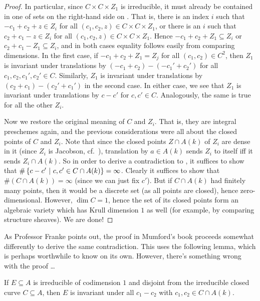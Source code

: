 \documentclass[a4paper,parskip=half,numbers=enddot, DIV=12]{scrreprt}
\begin{document}
\begin{proof}
	In particular, since $C\times C\times Z_1$ is irreducible, it must already be contained in one of sets on the right-hand side on . That is, there is an index $i$ such that $-c_1+c_2+z\in Z_i$ for all $(c_1,c_2,z)\in C\times C\times Z_1$, or there is an $i$ such that $c_2+c_1-z\in Z_i$ for all $(c_1,c_2,z)\in C\times C\times Z_1$. Hence $-c_1+c_2+Z_1\subseteq Z_i$ or $c_2+c_1-Z_1\subseteq Z_i$, and in both cases equality follows easily from comparing dimensions. In the first case, if $-c_1+c_2+Z_1=Z_j$ for all $(c_1,c_2)\in C^2$, then $Z_1$ is invariant under translations by $(-c_1+c_2)-(-c_1'+c_2')$ for all $c_1,c_2,c_1',c_2'\in C$. Similarly, $Z_1$ is invariant under translations by $(c_2+c_1)-(c_2'+c_1')$ in the second case. In either case, we see that $Z_1$ is invariant under translations by $c-c'$ for $c,c'\in C$. Analogously, the same is true for all the other $Z_i$.
	
	Now we restore the original meaning of $C$ and $Z_i$. That is, they are integral preschemes again, and the previous considerations were all about the closed points of $C$ and $Z_i$. Note that since the closed points $Z\cap A(k)$ of $Z_i$ are dense in it (since $Z_i$ is Jacobson, cf.\ \cite[Definition~2.4.2]{alggeo1}), translation by $a\in A(k)$ sends $Z_i$ to itself iff it sends $Z_i\cap A(k)$. So in order to derive a contradiction to , it suffices to show that $\#\left\{c-c'\ \middle|\  c,c'\in C\cap A(k)\right\}=\infty$. Clearly it suffices to show that $\# (C\cap A(k))=\infty$ (since we can just fix $c'$). But if $C\cap A(k)$ had finitely many points, then it would be a discrete set (as all points are closed), hence zero-dimensional. However, $\dim C=1$, hence the set of its closed points form an algebraic variety which has Krull dimension $1$ as well (for example, by comparing structure sheaves). We are done!
\end{proof}
As Professor Franke points out, the proof in Mumford's book proceeds somewhat differently to derive the same contradiction. This uses the following lemma, which is perhaps worthwhile to know on its own. However, there's something wrong with the proof \ldots
\begin{lem}
	If $E\subseteq A$ is irreducible of codimension $1$ and disjoint from the irreducible closed curve $C\subseteq A$, then $E$ is invariant under all $c_1-c_2$ with $c_1,c_2\in C\cap A(k)$.
\end{lem}
\end{document}
